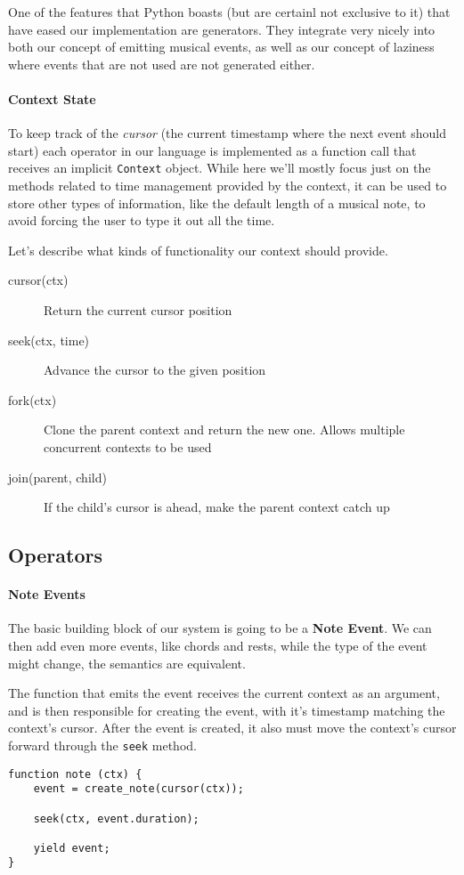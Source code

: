 \documentclass[a4paper,UKenglish,cleveref, autoref]{oasics-v2019}
\begin{document}
One of the features that Python boasts (but are certainl not exclusive to it) that have eased our implementation are generators. They integrate very nicely into both our concept of emitting musical events, as well as our concept of laziness where events that are not used are not generated either.

\paragraph*{Context State}
To keep track of the \textit{cursor} (the current timestamp where the next event should start) each operator in our language is implemented as a function call that receives an implicit \texttt{Context} object. While here we'll mostly focus just on the methods related to time management provided by the context, it can be used to store other types of information, like the default length of a musical note, to avoid forcing the user to type it out all the time.

Let's describe what kinds of functionality our context should provide.

\begin{description}
    \item[cursor(ctx)] Return the current cursor position
    \item[seek(ctx, time)] Advance the cursor to the given position
    \item[fork(ctx)] Clone the parent context and return the new one. Allows multiple concurrent contexts to be used
    \item[join(parent, child)] If the child's cursor is ahead, make the parent context catch up
\end{description}

\subsection{Operators}

\paragraph*{Note Events}
The basic building block of our system is going to be a \textbf{Note Event}. We can then add even more events, like chords and rests, while the type of the event might change, the semantics are equivalent.

The function that emits the event receives the current context as an argument, and is then responsible for creating the event, with it's timestamp matching the context's cursor. After the event is created, it also must move the context's cursor forward through the \texttt{seek} method.
\begin{lstlisting}[caption={Creating a Note Event},label=list:8-6,captionpos=t,abovecaptionskip=-\medskipamount]
function note (ctx) {
    event = create_note(cursor(ctx));
    
    seek(ctx, event.duration);
    
    yield event;
}
\end{lstlisting}
\end{document}
